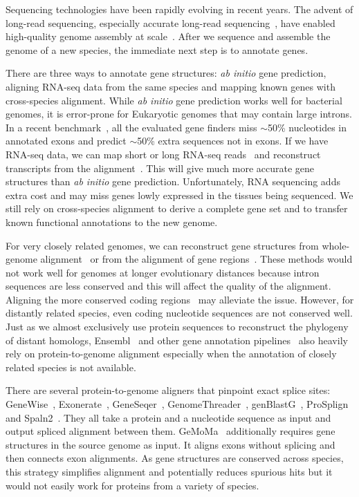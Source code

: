 \documentclass{bioinfo}
\begin{document}
Sequencing technologies have been rapidly evolving in recent years. The advent
of long-read sequencing, especially accurate long-read
sequencing~\citep{Wenger:2019ab}, have enabled high-quality genome assembly at
scale~\citep{Nurk:2020we,Cheng:2021aa,Cheng:2022aa}. After we sequence and
assemble the genome of a new species, the immediate next step is to annotate
genes.

There are three ways to annotate gene structures: \emph{ab initio} gene
prediction, aligning RNA-seq data from the same species and mapping known genes
with cross-species alignment.  While \emph{ab initio} gene prediction works
well for bacterial genomes, it is error-prone for Eukaryotic
genomes that may contain large introns. In a recent
benchmark~\citep{Scalzitti:2020wg}, all the evaluated gene finders miss
$\sim$50\% nucleotides in annotated exons and predict $\sim$50\% extra
sequences not in exons. If we have RNA-seq data, we can map short or long
RNA-seq reads~\citep{Dobin:2013kx,Li:2018ab} and reconstruct transcripts from
the alignment~\citep{Kovaka:2019wf}. This will give much more accurate gene
structures than \emph{ab initio} gene prediction. Unfortunately, RNA sequencing
adds extra cost and may miss genes lowly expressed in the tissues being
sequenced. We still rely on cross-species alignment to derive a complete gene
set and to transfer known functional annotations to the new genome.

For very closely related genomes, we can reconstruct gene structures from
whole-genome alignment~\citep{Fiddes:2018wn} or from the alignment of gene
regions~\citep{Shumate:2020ty}. These methods would not work well for genomes
at longer evolutionary distances because intron sequences are less conserved and
this will affect the quality of the alignment. Aligning the more conserved
coding regions~\citep{Li:2007aa,Gotoh:2008aa} may alleviate the issue. However,
for distantly related species, even coding nucleotide sequences are not
conserved well. Just as we almost exclusively use protein sequences to
reconstruct the phylogeny of distant homologs,
Ensembl~\citep{Aken:2016wr} and other gene annotation
pipelines~\citep{Haas:2008tv,Holt:2011tt,Bruna:2021ug} also heavily rely on
protein-to-genome alignment especially when the annotation of closely related
species is not available.

There are several protein-to-genome aligners that pinpoint exact splice sites:
GeneWise~\citep{Birney:1997vr,Birney:2004uy}, Exonerate~\citep{Slater:2005aa},
GeneSeqer~\citep{Usuka:2000vi},
GenomeThreader~\citep{DBLP:journals/infsof/GremmeBSK05},
genBlastG~\citep{She:2011aa}, ProSplign~\citep{Kapustin:2008tq} and
Spaln2~\citep{Gotoh:2008aa,Iwata:2012aa}. They all take a protein and a
nucleotide sequence as input and output spliced alignment between them.
GeMoMa~\citep{Keilwagen:2019wz} additionally requires gene structures in the
source genome as input. It aligns exons without splicing and then connects
exon alignments. As gene structures are conserved across species, this strategy
simplifies alignment and potentially reduces spurious hits but it would not
easily work for proteins from a variety of species.
\end{document}
